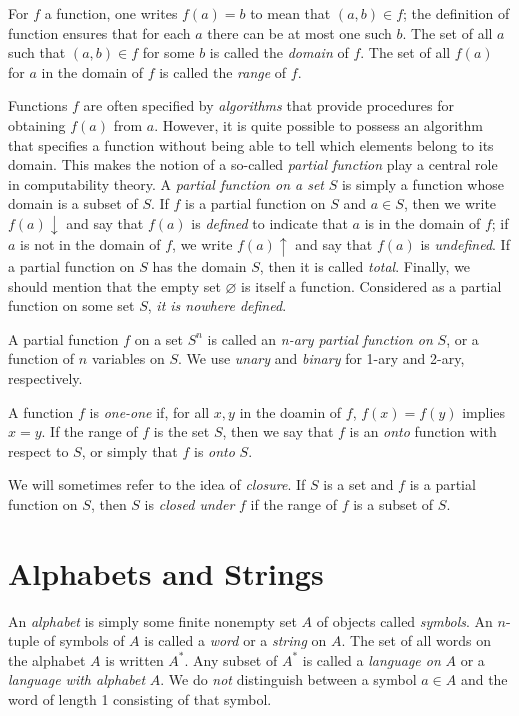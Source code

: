 \documentclass[a4paper,10pt,twoside]{book}
\begin{document}
For $f$ a function, one writes $f(a)=b$ to mean that $(a,b)\in f$; the definition of function ensures that for each $a$ there can be at most one such $b$. The set of all $a$ such that $(a,b)\in f$ for some $b$ is called the \textit{domain} of $f$. The set of all $f(a)$ for $a$ in the domain of $f$ is called the \textit{range} of $f$.

Functions $f$ are often specified by \textit{algorithms} that provide procedures for obtaining $f(a)$ from $a$. However, it is quite possible to possess an algorithm that specifies a function without being able to tell which elements belong to its domain. This makes the notion of a so-called \textit{partial function} play a central role in computability theory. A \textit{partial function on a set} $S$ is simply a function whose domain is a subset of $S$. If $f$ is a partial function on $S$ and $a\in S$, then we write $f(a)\downarrow$ and say that $f(a)$ is \textit{defined} to indicate that $a$ is in the domain of $f$; if $a$ is not in the domain of $f$, we write $f(a)\uparrow$ and say that $f(a)$ is \textit{undefined}. If a partial function on $S$ has the domain $S$, then it is called \textit{total}. Finally, we should mention that the empty set $\varnothing$ is itself a function. Considered as a partial function on some set $S$, \textit{it is nowhere defined}.

A partial function $f$ on a set $S^n$ is called an \textit{n-ary partial function on} $S$, or a function of $n$ variables on $S$. We use \textit{unary} and \textit{binary} for 1-ary and 2-ary, respectively.

A function $f$ is \textit{one-one} if, for all $x,y$ in the doamin of $f$, $f(x)=f(y)$ implies $x=y$. If the range of $f$ is the set $S$, then we say that $f$ is an \textit{onto} function with respect to $S$, or simply that $f$ is \textit{onto} $S$.

We will sometimes refer to the idea of \textit{closure}. If $S$ is a set and $f$ is a partial function on $S$, then $S$ is \textit{closed under} $f$ if the range of $f$ is a subset of $S$.

\section{Alphabets and Strings}

An \textit{alphabet} is simply some finite nonempty set $A$ of objects called \textit{symbols}. An $n$-tuple of symbols of $A$ is called a \textit{word} or a \textit{string} on $A$. The set of all words on the alphabet $A$ is written $A^*$. Any subset of $A^*$ is called a \textit{language on} $A$ or a \textit{language with alphabet} $A$. We do \textit{not} distinguish between a symbol $a\in A$ and the word of length 1 consisting of that symbol.
\end{document}
